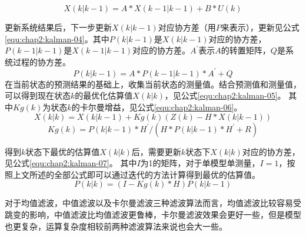 \begin{equation}
\label{equ:chap2:kalman-03}
X(k|k-1)=A \ast X(k-1|k-1)+B \ast U(k)
\end{equation}
\par 更新系统结果后，下一步更新$X(k|k-1)$对应协方差（用$P$来表示），更新见公式\ref{equ:chap2:kalman-04}。其中$P(k|k-1)$是$X(k|k-1)$对应的协方差，$P(k-1|k-1)$是$X(k-1|k-1)$对应的协方差。$A^{'}$表示$A$的转置矩阵，$Q$是系统过程的协方差。
\begin{equation}
\label{equ:chap2:kalman-04}
P(k|k-1)=A \ast P(k-1|k-1) \ast A^{'}+Q
\end{equation}
在当前状态的预测结果的基础上，收集当前状态的测量值。结合预测值和测量值，可以得到现在状态$k$的最优化估算值$X(k|k)$，见公式\ref{equ:chap2:kalman-05}。 其中$Kg(k)$为状态$k$的卡尔曼增益，见公式\ref{equ:chap2:kalman-06}。
\begin{equation}
\label{equ:chap2:kalman-05}
X(k|k)=X(k|k-1)+Kg(k)(Z(k)-H \ast X(k|k-1))
\end{equation}
\begin{equation}
\label{equ:chap2:kalman-06}
Kg(k)=P(k|k-1) \ast H^{'}/(H \ast P(k|k-1) \ast H^{'}+R)
\end{equation}
\par 得到$k$状态下最优的估算值$X(k|k)$后，需要更新$k$状态下$X(k|k)$对应的协方差，见公式\ref{equ:chap2:kalman-07}。 其中$I$为1的矩阵，对于单模型单测量，$I=1$，按照上文所述的全部公式即可以通过迭代的方法计算得到最优的估算值。
\begin{equation}
\label{equ:chap2:kalman-07}
P(k|k)=(I-Kg(k) \ast H)P(k|k-1)
\end{equation}
\par 对于均值滤波，中值滤波以及卡尔曼滤波三种滤波算法而言，均值滤波比较容易受跳变的影响，中值滤波比均值滤波更鲁棒，卡尔曼滤波效果会更好一些，但是模型也更复杂，运算复杂度相较前两种滤波算法来说也会大一些。
